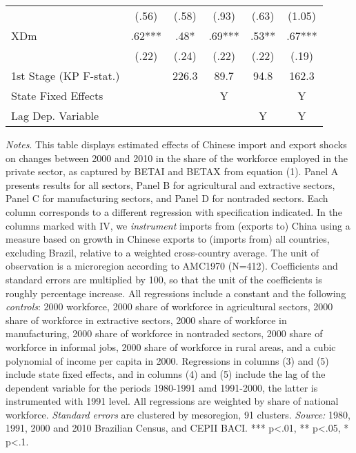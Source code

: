 \begin{center}
\begin{table}[h!]
\begin{center}
\begin{centering}
\begin{tabular}{lccccc}
 & {\scriptsize{}(.56)} & {\scriptsize{}(.58)} & {\scriptsize{}(.93)} & {\scriptsize{}(.63)} & {\scriptsize{}(1.05)}\tabularnewline
{\footnotesize{}XDm} & {\footnotesize{} .62***} & {\footnotesize{} .48*} & {\footnotesize{} .69***} & {\footnotesize{} .53**} & {\footnotesize{} .67***}\tabularnewline
 & {\scriptsize{}(.22)} & {\scriptsize{}(.24)} & {\scriptsize{}(.22)} & {\scriptsize{}(.22)} & {\scriptsize{}(.19)}\tabularnewline
{\scriptsize{}1st Stage (KP F-stat.)} &  & {\scriptsize{} 226.3} & {\scriptsize{} 89.7} & {\scriptsize{} 94.8} & {\scriptsize{} 162.3}\tabularnewline
\hline 
{\scriptsize{}State Fixed Effects} &  &  & {\scriptsize{}Y} &  & {\scriptsize{}Y}\tabularnewline
{\scriptsize{}Lag Dep. Variable} &  &  &  & {\scriptsize{}Y} & {\scriptsize{}Y}\tabularnewline
\hline 
\end{tabular}
\par\end{centering}
\medskip
\end{center}
\footnotesize
\emph{Notes}. This table displays estimated effects of Chinese import and export shocks on changes between 2000 and 2010 in the share of the workforce employed in the private sector, as captured by BETAI and BETAX from equation (1). Panel A presents results for all sectors, Panel B for agricultural and extractive sectors, Panel C for manufacturing sectors, and Panel D for nontraded sectors. Each column corresponds to a different regression with specification indicated. In the columns marked with IV, we \emph{instrument} imports from (exports to) China using a measure based on growth in Chinese exports to (imports from) all countries, excluding Brazil, relative to a weighted cross-country average. The unit of observation is a microregion according to AMC1970 (N=412). Coefficients and standard errors are multiplied by 100, so that the unit of the coefficients is roughly percentage increase. All regressions include a constant and the following \emph{controls}: 2000 workforce, 2000 share of workforce in agricultural sectors, 2000 share of workforce in extractive sectors, 2000 share of workforce in manufacturing, 2000 share of workforce in nontraded sectors, 2000 share of workforce in informal jobs, 2000 share of workforce in rural areas, and a cubic polynomial of income per capita in 2000. Regressions in columns (3) and (5) include state fixed effects, and in columns (4) and (5) include the lag of the dependent variable for the periods 1980-1991 amd 1991-2000, the latter is instrumented with 1991 level. All regressions are weighted by share of national workforce.
 \emph{Standard errors} are clustered by mesoregion, 91 clusters. \emph{Source:} 1980, 1991, 2000 and 2010 Brazilian Census, and CEPII BACI. *** p<.01, ** p<.05, * p<.1.
\end{table}
\par \end{center}
